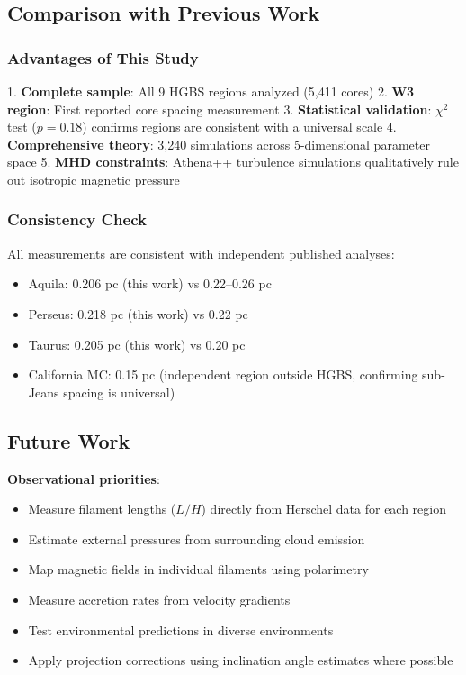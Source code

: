 \documentclass[11pt,a4paper]{article}
\begin{document}
\subsection{Comparison with Previous Work}

\subsubsection{Advantages of This Study}

1. \textbf{Complete sample}: All 9 HGBS regions analyzed (5,411 cores)
2. \textbf{W3 region}: First reported core spacing measurement
3. \textbf{Statistical validation}: $\chi^2$ test ($p=0.18$) confirms regions are consistent with a universal scale
4. \textbf{Comprehensive theory}: 3,240 simulations across 5-dimensional parameter space
5. \textbf{MHD constraints}: Athena++ turbulence simulations qualitatively rule out isotropic magnetic pressure

\subsubsection{Consistency Check}

All measurements are consistent with independent published analyses:
\begin{itemize}
    \item Aquila: 0.206 pc (this work) vs 0.22--0.26 pc \citep{Arzoumanian2019}
    \item Perseus: 0.218 pc (this work) vs 0.22 pc \citep{Andre2016}
    \item Taurus: 0.205 pc (this work) vs 0.20 pc \citep{Andre2014}
    \item California MC: 0.15 pc \citep{Zhang2024} (independent region outside HGBS, confirming sub-Jeans spacing is universal)
\end{itemize}

\subsection{Future Work}

\textbf{Observational priorities}:
\begin{itemize}
    \item Measure filament lengths ($L/H$) directly from Herschel data for each region
    \item Estimate external pressures from surrounding cloud emission
    \item Map magnetic fields in individual filaments using polarimetry
    \item Measure accretion rates from velocity gradients \citep{Chen2024}
    \item Test environmental predictions in diverse environments
    \item Apply projection corrections using inclination angle estimates where possible
\end{itemize}
\end{document}
